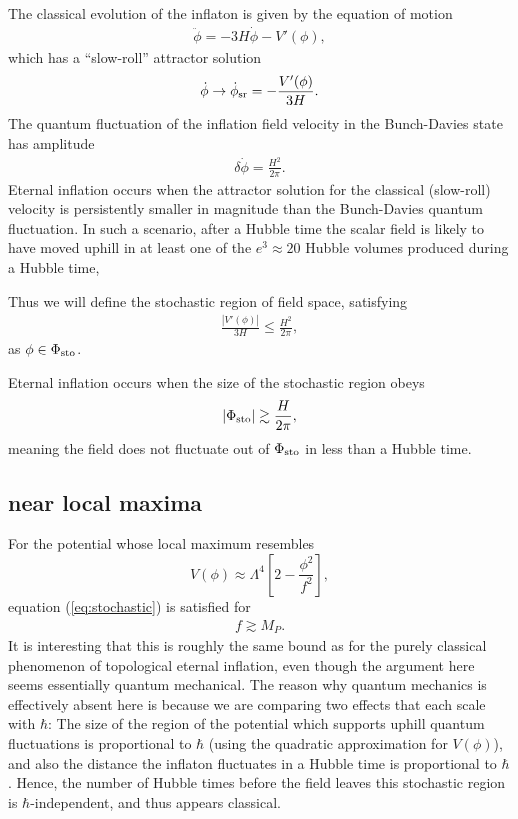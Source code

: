 \documentclass[aps,amsfonts,amsmath,prd,preprint,nofootinbib,superscriptaddress]{revtex4}
\newcommand{\Mp}{{M_{P}}}
\newcommand{\MMp}{{M_P^2}}
\newcommand{\beq}{\begin{equation}}
\newcommand{\eeq}{\end{equation}}
\begin{document}
\begin{appendix}
The classical evolution of the inflaton is given by the equation of motion
\begin{align}
\ddot \phi = -3 H \dot \phi - V'(\phi),
\end{align}
which has a ``slow-roll'' attractor solution
\begin{align}
\dot \phi \to \dot \phi_{\rm sr} = -\frac{V'(\phi)}{3 H}.
\end{align}
 The quantum fluctuation of the inflation field velocity in the Bunch-Davies state has amplitude
\begin{align}
\delta \dot \phi = \frac{H^2}{2\pi}.
\end{align} 
Eternal inflation occurs when the attractor solution for the classical (slow-roll) velocity
is persistently smaller in magnitude than the Bunch-Davies quantum fluctuation.  In such a scenario, after a Hubble
time the scalar field is likely to have moved uphill in at least one of the $e^3\approx 20$ Hubble volumes produced during
a Hubble time, 

Thus we will define the stochastic region of field space, satisfying
\begin{align}
\frac{\left| V'(\phi)\right|}{3 H} \leq  \frac{H^2}{2\pi},
\end{align}
as $\phi \in \Phi_{\rm sto}$.

Eternal inflation occurs when the size of the stochastic region obeys 
\begin{align}
\left|\Phi_{\rm sto}\right| \gtrsim \frac{H}{2\pi},\label{eq:stochastic}
\end{align} 
meaning the field does not fluctuate out of $\Phi_{\rm sto}$ in less than a Hubble time.


\subsection{near local maxima}\label{app:sei}

For the potential whose local maximum resembles
\beq
V(\phi) \approx \Lambda^4\left[2 - \frac{\phi^2}{f^2}\right], \label{eq:Vp2}
\eeq
equation (\ref{eq:stochastic}) is satisfied for
\begin{align}
f \gtrsim \Mp.
\end{align}
It is interesting that this is roughly the same bound as for the purely classical phenomenon of topological eternal inflation, even though the argument here seems essentially quantum mechanical.  The reason
why quantum mechanics is effectively absent here is because we are comparing two effects that each scale with $\hbar$:  The size of the region of the potential which supports uphill quantum fluctuations is proportional to $\hbar$ (using the quadratic approximation for $V(\phi)$), and also the distance the inflaton fluctuates in a Hubble time is proportional to $\hbar$.  Hence, the number of Hubble times before the field leaves this stochastic region is $\hbar$-independent, and thus appears classical.



\end{appendix}
\end{document}
